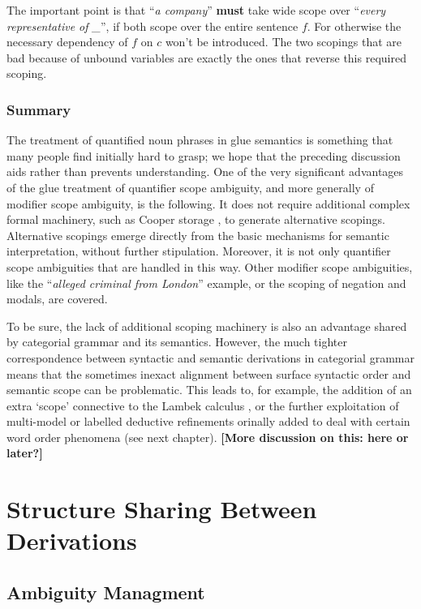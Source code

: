 The important point
is  that
``{\it a company}'' {\bf must} take wide scope over 
``{\it every representative of \_}'', if both scope over the entire
sentence $f$. For otherwise the necessary
dependency of $f$ on $c$ won't be introduced.  The two scopings that
are bad because of unbound variables are exactly the ones that reverse
this required scoping.

\subsubsection{Summary}

The treatment of quantified noun phrases in glue semantics is something
that many people find initially hard to grasp; we hope that the preceding
discussion aids rather than prevents understanding.  One of the
very significant advantages of the glue treatment of quantifier scope
ambiguity, and more generally of modifier scope ambiguity, is the following.
It does not require additional complex formal machinery, such as Cooper 
storage \cite{Cooper}, to generate alternative scopings.  Alternative
scopings emerge directly from the basic mechanisms for semantic 
interpretation, without further stipulation.
  Moreover, it is not only quantifier scope ambiguities that are handled
in this way.  Other modifier scope ambiguities, like the ``{\it alleged
criminal from London}'' example, or the scoping of negation and
modals, are covered.

To be sure, the lack of additional scoping machinery is also an advantage 
shared
by categorial grammar and its semantics.  However, the much tighter
correspondence between syntactic and semantic derivations in categorial
grammar means that the sometimes inexact alignment between surface
syntactic order and semantic scope can be problematic.  This leads to,
for example, the addition of an extra `scope' connective to the Lambek
calculus , or the further exploitation of multi-model
or labelled deductive refinements orinally added to deal with certain
word order phenomena (see next chapter).  {\bf [More discussion on this:
here or later?]}


\section{Structure Sharing Between Derivations}

\subsection{Ambiguity Managment}

